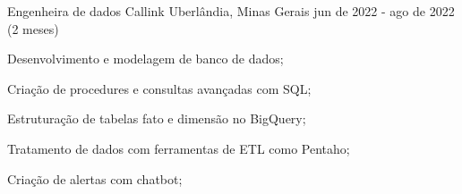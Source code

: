 \cventry
    {Engenheira de dados}
    {Callink}
    {Uberlândia, Minas Gerais}
    {jun de 2022 - ago de 2022 (2 meses)}
    {
        \begin{cvitems}
            \item {
                Desenvolvimento e modelagem de banco de dados;
            }
            \item {
                Criação de procedures e consultas avançadas com SQL;
            }
            \item {
                Estruturação de tabelas fato e dimensão no BigQuery;
            }
            \item {
                Tratamento de dados com ferramentas de ETL como Pentaho; 
            }
            \item {
                Criação de alertas com chatbot; 
            }
        \end{cvitems}
    }
    {}